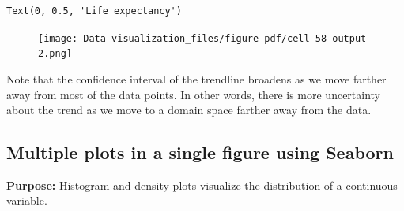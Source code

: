 \documentclass[
  letterpaper,
  DIV=11,
  numbers=noendperiod]{scrreprt}
\newenvironment{Shaded}{\begin{snugshade}}{\end{snugshade}}
\newcommand{\BuiltInTok}[1]{\textcolor[rgb]{0.00,0.23,0.31}{#1}}
\newcommand{\CommentTok}[1]{\textcolor[rgb]{0.37,0.37,0.37}{#1}}
\newcommand{\DecValTok}[1]{\textcolor[rgb]{0.68,0.00,0.00}{#1}}
\newcommand{\FloatTok}[1]{\textcolor[rgb]{0.68,0.00,0.00}{#1}}
\newcommand{\NormalTok}[1]{\textcolor[rgb]{0.00,0.23,0.31}{#1}}
\newcommand{\OperatorTok}[1]{\textcolor[rgb]{0.37,0.37,0.37}{#1}}
\newcommand{\StringTok}[1]{\textcolor[rgb]{0.13,0.47,0.30}{#1}}
\begin{document}
\begin{Shaded}
\end{Shaded}

\begin{verbatim}
Text(0, 0.5, 'Life expectancy')
\end{verbatim}

\begin{figure}[H]

{\centering \texttt{[image: Data visualization\_files/figure-pdf/cell-58-output-2.png]}

}

\end{figure}

Note that the confidence interval of the trendline broadens as we move
farther away from most of the data points. In other words, there is more
uncertainty about the trend as we move to a domain space farther away
from the data.

\hypertarget{multiple-plots-in-a-single-figure-using-seaborn}{%
\subsection{Multiple plots in a single figure using
Seaborn}\label{multiple-plots-in-a-single-figure-using-seaborn}}

\textbf{Purpose:} Histogram and density plots visualize the distribution
of a continuous variable.
\end{document}
